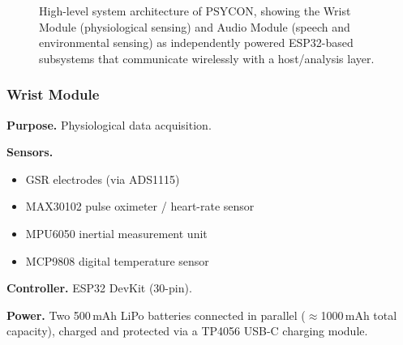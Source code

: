 \begin{figure}[t]
\caption{High-level system architecture of PSYCON, showing the Wrist Module (physiological sensing) and Audio Module (speech and environmental sensing) as independently powered ESP32-based subsystems that communicate wirelessly with a host/analysis layer.}
\label{fig:system-architecture}
\end{figure}

\subsubsection{Wrist Module}
\label{sec:wrist-module}

\textbf{Purpose.} Physiological data acquisition.

\textbf{Sensors.}
\begin{itemize}
    \item GSR electrodes (via ADS1115)
    \item MAX30102 pulse oximeter / heart-rate sensor
    \item MPU6050 inertial measurement unit
    \item MCP9808 digital temperature sensor
\end{itemize}

\textbf{Controller.} ESP32 DevKit (30-pin).

\textbf{Power.} Two 500\,mAh LiPo batteries connected in parallel ($\approx$1000\,mAh total capacity), charged and protected via a TP4056 USB-C charging module.

